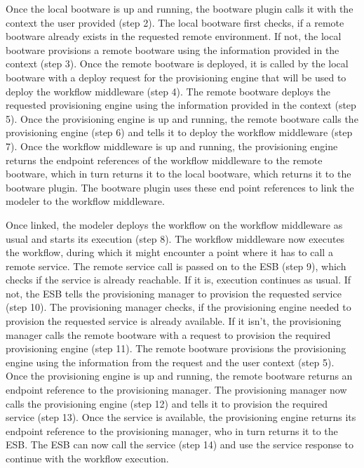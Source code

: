 Once the local bootware is up and running, the bootware plugin calls it with the context the user provided (step 2).
The local bootware first checks, if a remote bootware already exists in the requested remote environment.
If not, the local bootware provisions a remote bootware using the information provided in the context (step 3).
Once the remote bootware is deployed, it is called by the local bootware with a deploy request for the provisioning engine that will be used to deploy the workflow middleware (step 4).
The remote bootware deploys the requested provisioning engine using the information provided in the context (step 5).
Once the provisioning engine is up and running, the remote bootware calls the provisioning engine (step 6) and tells it to deploy the workflow middleware (step 7).
Once the workflow middleware is up and running, the provisioning engine returns the endpoint references of the workflow middleware to the remote bootware, which in turn returns it to the local bootware, which returns it to the bootware plugin.
The bootware plugin uses these end point references to link the modeler to the workflow middleware.

Once linked, the modeler deploys the workflow on the workflow middleware as usual and starts its execution (step 8).
The workflow middleware now executes the workflow, during which it might encounter a point where it has to call a remote service.
The remote service call is passed on to the ESB (step 9), which checks if the service is already reachable.
If it is, execution continues as usual.
If not, the ESB tells the provisioning manager to provision the requested service (step 10).
The provisioning manager checks, if the provisioning engine needed to provision the requested service is already available.
If it isn't, the provisioning manager calls the remote bootware with a request to provision the required provisioning engine (step 11).
The remote bootware provisions the provisioning engine using the information from the request and the user context (step 5).
Once the provisioning engine is up and running, the remote bootware returns an endpoint reference to the provisioning manager.
The provisioning manager now calls the provisioning engine (step 12) and tells it to provision the required service (step 13).
Once the service is available, the provisioning engine returns its endpoint reference to the provisioning manager, who in turn returns it to the ESB.
The ESB can now call the service (step 14) and use the service response to continue with the workflow execution.

